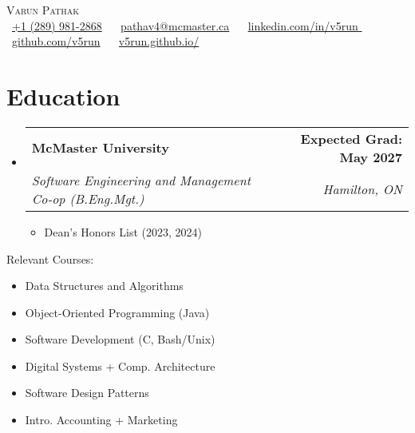 \documentclass[letterpaper,11pt]{article}
\makeatletter
\newcommand{\resumeItem}[1]{
  \item\small{
    {#1 \vspace{0pt}}
  }
}
\newcommand{\resumeSubheading}[4]{
  \vspace{-2pt}\item
    \begin{tabular*}{1.0\textwidth}[t]{l@{\extracolsep{\fill}}r}
      \textbf{#1} & \textbf{\small #2} \\
      \textit{\small#3} & \textit{\small #4} \\
    \end{tabular*}\vspace{-7pt}
}
\newcommand{\resumeSubHeadingListStart}{\begin{itemize}[leftmargin=0.0in, label={}]}
\newcommand{\resumeSubHeadingListEnd}{\end{itemize}\vspace{0pt}}
\newcommand{\resumeItemListStart}{\begin{itemize}}
\newcommand{\resumeItemListEnd}{\end{itemize}\vspace{-5pt}}
\makeatother
\begin{document}
\begin{center}
    {\Large \scshape Varun Pathak} \\[2mm]
    \footnotesize \raisebox{-0.1\height}
    \faPhone\ \underline{+1 (289) 981-2868} ~ 
    {\faEnvelope\  \underline{pathav4@mcmaster.ca}} ~ 
    {\faLinkedin\ \underline{linkedin.com/in/v5run }}  ~
    {\faGithub\ \underline{github.com/v5run}} ~
    {\faBriefcase\ \underline{v5run.github.io/}}
    \vspace{-8pt}
\end{center}

\section{Education}
  \resumeSubHeadingListStart
    \resumeSubheading
      {McMaster University}{Expected Grad: May 2027}
      {Software Engineering and Management Co-op (B.Eng.Mgt.)}{Hamilton, ON}
      \resumeItemListStart
        \resumeItem{Dean’s Honors List (2023, 2024)}
      \resumeItemListEnd
  \resumeSubHeadingListEnd

{\footnotesize

Relevant Courses: \\[2mm]
\resumeSubHeadingListStart
\begin{multicols}{3}  %
\begin{itemize}[leftmargin=+25pt, itemsep=-1pt]  %
\item Data Structures and Algorithms
\item Object-Oriented Programming (Java)
\item Software Development (C, Bash/Unix)
\item Digital Systems + Comp. Architecture
\item Software Design Patterns
\item Intro. Accounting + Marketing
\end{itemize}  %
\end{multicols}  %
\resumeSubHeadingListEnd
}
\vspace{-10pt}
\end{document}

